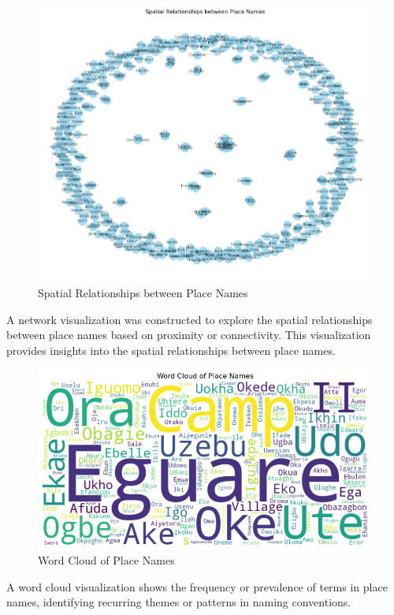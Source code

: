 \begin{figure}[H]
    \centering
    \includegraphics[width=1\linewidth]{networkanalysis.png}
    \caption{Spatial Relationships between Place Names}
    \label{fig:network}
\end{figure}

A network visualization was constructed to explore the spatial relationships between place names based on proximity or connectivity. This visualization provides insights into the spatial relationships between place names.

\begin{figure}[H]
    \centering
    \includegraphics[width=1\linewidth]{wordcloud.png}
    \caption{Word Cloud of Place Names}
    \label{fig:wordcloud}
\end{figure}
A word cloud visualization shows the frequency or prevalence of terms in place names, identifying recurring themes or patterns in naming conventions.
